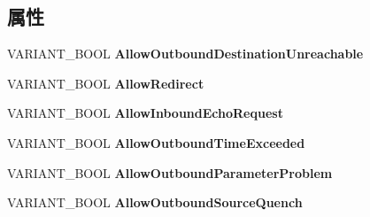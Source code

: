 \subsection*{属性}
\begin{DoxyCompactItemize}
\item 
\mbox{\label{interface_i_net_fw_icmp_settings_a7caf1baa3c1daf3e0db100e847563a43}} 
V\+A\+R\+I\+A\+N\+T\+\_\+\+B\+O\+OL {\bfseries Allow\+Outbound\+Destination\+Unreachable}
\item 
\mbox{\label{interface_i_net_fw_icmp_settings_ad18ebce20c96ceed5d53ec95b7932218}} 
V\+A\+R\+I\+A\+N\+T\+\_\+\+B\+O\+OL {\bfseries Allow\+Redirect}
\item 
\mbox{\label{interface_i_net_fw_icmp_settings_ad16ff78586f3bcaaf07817ea3827c034}} 
V\+A\+R\+I\+A\+N\+T\+\_\+\+B\+O\+OL {\bfseries Allow\+Inbound\+Echo\+Request}
\item 
\mbox{\label{interface_i_net_fw_icmp_settings_afa91ca30f9bd21a5c7af1a9b7990c039}} 
V\+A\+R\+I\+A\+N\+T\+\_\+\+B\+O\+OL {\bfseries Allow\+Outbound\+Time\+Exceeded}
\item 
\mbox{\label{interface_i_net_fw_icmp_settings_a9b169648da94c6a170e2a28d6cbf0a0f}} 
V\+A\+R\+I\+A\+N\+T\+\_\+\+B\+O\+OL {\bfseries Allow\+Outbound\+Parameter\+Problem}
\item 
\mbox{\label{interface_i_net_fw_icmp_settings_a54713c3a8aa144dd4ef17c341559b077}} 
V\+A\+R\+I\+A\+N\+T\+\_\+\+B\+O\+OL {\bfseries Allow\+Outbound\+Source\+Quench}
\item 
\mbox{\label{interface_i_net_fw_icmp_settings_ad73774d7f8a1cefef643c394e3572522}} 

\end{DoxyCompactItemize}
